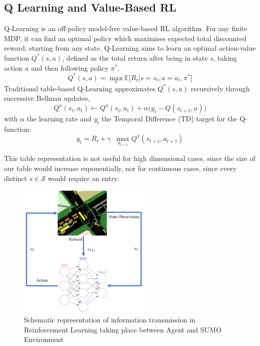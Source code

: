 \documentclass[sigconf,anonymous]{aamas}
\begin{document}
\subsection{Q Learning and Value-Based RL}
Q-Learning\cite{watkins} is an off-policy model-free value-based RL algorithm. For any finite MDP, it can find an optimal policy which maximises expected total discounted reward, starting from any state\cite{melo}.
Q-Learning aims to learn an optimal action-value function $Q^*(s,a)$, defined as the total return after being in state $s$, taking action $a$ and then following policy $\pi^*$. %
\begin{equation}
Q^*(s,a) = \max_{\pi} \mathbb{E} \big[ R_t | s=s_t, a=a_t, \pi^* \big]
\label{eq:qlearning}
\end{equation}
Traditional table-based Q-Learning approximates $Q^*(s,a)$ recursively through successive Bellman updates,
\begin{equation}
Q^{\pi}(s_t,a_t) \leftarrow Q^{\pi}(s_t,a_t) + \alpha \big( y_t - Q(s_{t+1},a) \big)
\label{eq:bellmanupdate}
\end{equation}
with $\alpha$ the learning rate and $y_t$ the Temporal Difference (TD) target for the Q-function:
\begin{equation}
y_t = R_t + \gamma \,\,\, \max_{a_{t+1}} Q^{\pi}(s_{t+1},a_{t+1})
\end{equation}

This table representation is not useful for high dimensional cases, since the size of our table would increase exponentially, nor for continuous cases, since every distinct $s\in\mathcal{S}$ would require an entry.

\begin{figure}                                                
\centering                                                    
\includegraphics[width=2.5in]{schematic_pp2.png}                                    
\caption{Schematic representation of information transmission in Reinforcement Learning taking place between Agent and SUMO Environment}                                  
\label{rl}                                               
\end{figure}  
\end{document}
